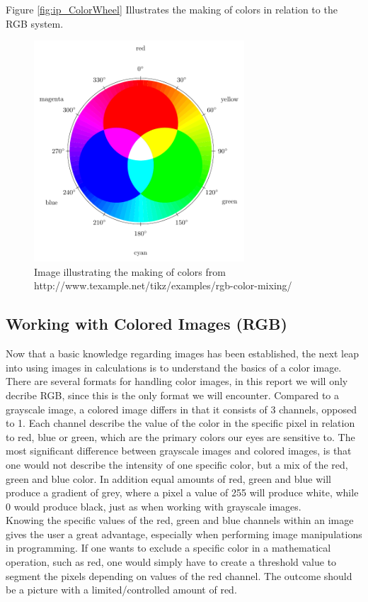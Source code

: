 Figure \eqref{fig:ip_ColorWheel} Illustrates the making of colors in relation to the RGB system.\\
\begin{figure}[htbp]
\centering
\includegraphics[width=0.70\textwidth]{Pictures/Theory/RGBColor.pdf}
\caption{Image illustrating the making of colors from http://www.texample.net/tikz/examples/rgb-color-mixing/}
\label{fig:ip_ColorWheel}
\end{figure}  

\subsection{Working with Colored Images (RGB)}
Now that a basic knowledge regarding images has been established, the next leap into using images in calculations is to understand the basics of a color image.\\
There are several formats for handling color images, in this report we will only decribe RGB, since this is the only format we will encounter. Compared to a grayscale image, a colored image differs in that it consists of 3 channels, opposed to 1. Each channel describe the value of the color in the specific pixel in relation to red, blue or green, which are the primary colors our eyes are sensitive to. The most significant difference between grayscale images and colored images, is that one would not describe the intensity of one specific color, but a mix of the red, green and blue color. In addition equal amounts of red, green and blue  will produce a gradient of grey, where a pixel a value of 255 will produce white, while 0 would produce black, just as when working with grayscale images.\\
Knowing the specific values of the red, green and blue channels within an image gives the user a great advantage, especially when performing image manipulations in programming. If one wants to exclude a specific color in a mathematical operation, such as red, one would simply have to create a threshold value to segment the pixels depending on values of the red channel. The outcome should be a picture with a limited/controlled amount of red. 

